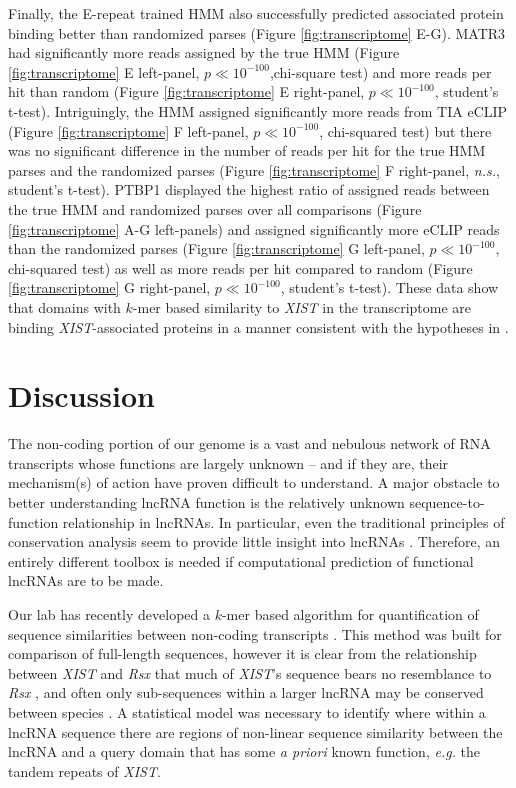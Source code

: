 Finally, the E-repeat trained HMM also successfully predicted associated protein binding better than randomized parses (Figure \ref{fig:transcriptome} E-G). MATR3 had significantly more reads assigned by the true HMM (Figure \ref{fig:transcriptome} E left-panel, $p\ll 10^{-100}$,chi-square test) and more reads per hit than random (Figure \ref{fig:transcriptome} E right-panel, $p\ll 10^{-100}$, student's t-test). Intriguingly, the HMM assigned significantly more reads from TIA eCLIP (Figure \ref{fig:transcriptome} F left-panel, $p\ll 10^{-100}$, chi-squared test) but there was no significant difference in the number of reads per hit for the true HMM parses and the randomized parses (Figure \ref{fig:transcriptome} F right-panel, \emph{n.s.}, student's t-test). PTBP1 displayed the highest ratio of assigned reads between the true HMM and randomized parses over all comparisons (Figure \ref{fig:transcriptome} A-G left-panels) and assigned significantly more eCLIP reads than the randomized parses (Figure \ref{fig:transcriptome} G left-panel, $p\ll10^{-100}$, chi-squared test) as well as more reads per hit compared to random (Figure \ref{fig:transcriptome} G right-panel, $p\ll10^{-100}$, student's t-test). These data show that domains with $k$-mer based similarity to \textit{XIST} in the transcriptome are binding \textit{XIST}-associated proteins in a manner consistent with the hypotheses in \cite{Kirk2018FunctionalContent,Sprague2019NonlinearDomains}.  



\section{Discussion}
The non-coding portion of our genome is a vast and nebulous network of RNA transcripts whose functions are largely unknown -- and if they are, their mechanism(s) of action have proven difficult to understand. A major obstacle to better understanding lncRNA function is the relatively unknown sequence-to-function relationship in lncRNAs. In particular, even the traditional principles of conservation analysis seem to provide little insight into lncRNAs \cite{Johnsson2014EvolutionaryFunction,Pang2006RapidFunction,Nesterova2001CharacterizationSequence}. Therefore, an entirely different toolbox is needed if computational prediction of functional lncRNAs are to be made.

Our lab has recently developed a $k$-mer based algorithm for quantification of sequence similarities between non-coding transcripts \cite{Kirk2018FunctionalContent}. This method was built for comparison of full-length sequences, however it is clear from the relationship between \emph{XIST} and \emph{Rsx} that much of \emph{XIST}'s sequence bears no resemblance to \emph{Rsx} \cite{Sprague2019NonlinearDomains}, and often only sub-sequences within a larger lncRNA may be conserved between species \cite{Pang2006RapidFunction,Nesterova2001CharacterizationSequence}. A statistical model was necessary to identify where within a lncRNA sequence there are regions of non-linear sequence similarity between the lncRNA and a query domain that has some \emph{a priori} known function, \textit{e.g.} the tandem repeats of \textit{XIST}. 

